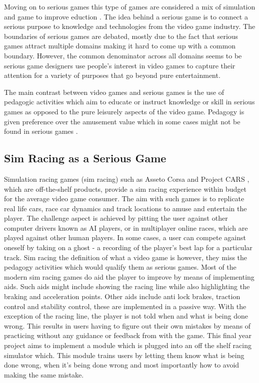 \documentclass{article}
\begin{document}
Moving on to serious games this type of games are considered a mix of simulation and game to improve eduction \cite{abt1970}. The idea behind a serious game is to connect a serious purpose to knowledge and technologies from the video game industry\cite{michael2005serious}. The boundaries of serious games are debated, mostly due to the fact that serious games attract multiple domains making it hard to come up with a common boundary. However, the common denominator across all domains seems to be serious game designers use people's interest in video games to capture their attention for a variety of purposes that go beyond pure entertainment\cite{djaouti2011classifying}.

The main contrast between video games and serious games is the use of pedagogic activities which aim to educate or instruct knowledge or skill \cite{zyda2005visual} in serious games as opposed to the pure leisurely aspects of the video game. Pedagogy is given preference over the amusement value which in some cases might not be found in serious games \cite{zyda2005visual}.

\subsection{Sim Racing as a Serious Game}

Simulation racing games (sim racing) such as Asseto Corsa \cite{assestoCorsa} and Project CARS \cite{ProjectCars} , which are off-the-shelf products, provide a sim racing experience within budget for the average video game consumer. The aim with such games is to replicate real life cars, race car dynamics and track locations to amuse and entertain the player. The challenge aspect is achieved by pitting the user against other computer drivers known as AI players, or in multiplayer online races, which are played against other human players. In some cases, a user can compete against oneself by taking on a ghost - a recording of the player's best lap for a particular track. Sim racing the definition of what a video game is however, they miss the pedagogy activities which would qualify them as serious games. Most of the modern sim racing games do aid the player to improve by means of implementing aids. Such aids might include showing the racing line while also highlighting the braking and acceleration points. Other aids include anti lock brakes, traction control and stability control, these are implemented in a passive way. With the exception of the racing line, the player is not told when and what is being done wrong. This results in users having to figure out their own mistakes by means of practicing without any guidance or feedback from with the game. This final year project aims to implement a module which is plugged into an off the shelf racing simulator which. This module trains users by letting them know what is being done wrong, when it's being done wrong and most importantly how to avoid making the same mistake.
\end{document}
